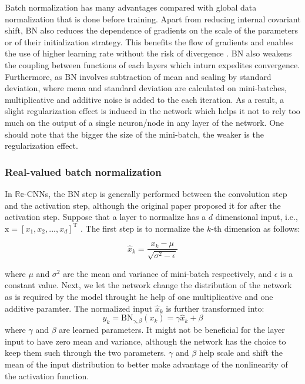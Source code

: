 Batch normalization has many advantages compared with global data
normalization that is done before training. Apart from reducing internal covariant shift, BN also reduces the dependence of gradients on the scale of the parameters or of their initialization strategy. This benefits the flow of gradients and enables the use of higher learning rate without the risk of divergence \cite{recent_advances}. BN also weakens the coupling between functions of each layers which inturn expedites convergence.  
Furthermore, as BN involves subtraction of mean and scaling by standard deviation, where mena and standard deviation are calculated on mini-batches, multiplicative and additive noise is added to the each iteration. As a result, a slight regularization effect is induced in the network which helps it not to rely too much on the output of a single neuron/node in any layer of the network. One should note that the bigger the size of the mini-batch, the weaker is the regularization effect. 

 \subsubsection{Real-valued batch normalization}\label{rvbn}
In $\mathbb{Re}$-CNNs, the BN step is generally performed between the convolution step and the activation step, although the original paper \cite{bnIoffeS15} proposed it for after the activation step. Suppose that a layer to normalize has a $d$ dimensional
input, i.e., $\mathrm{x} = [x_{1} , x_{2} , ..., x_{d} ]^{\mathrm{T}}$ .  The first step is to normalize the $k$-th dimension as follows:


 \begin{equation}
\hat{x}_{k} = \frac{x_{k} - \mu}{\sqrt{\sigma^{2} - \epsilon}}
\label{eqrbn1}
\end{equation}

where $\mu$ and $\sigma^{2}$ are the mean and variance of mini-batch respectively, and $\epsilon$ is a constant value. Next, we let the network change the distribution of the network as is required by the model throught he help of one multiplicative and one additive paramter. The normalized input $\hat{x}_{k}$ is further transformed into:
 \begin{equation}
y_{k} = \mathrm{BN}_{\gamma,\beta}(x_{k}) = \gamma\hat{x}_{k} + \beta
\label{eqrbn2}
\end{equation}
where $\gamma$ and $\beta$ are learned parameters. It might not be beneficial for the layer input to have zero mean and variance, although the network has the choice to keep them such through the two parameters. $\gamma$ and $\beta$ help scale and shift the mean of the input distribution to better make advantage of the nonlinearity of the activation function.


